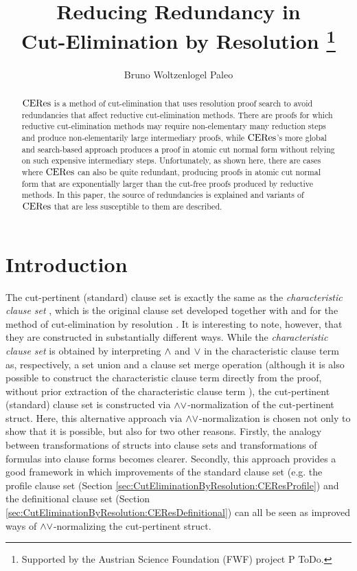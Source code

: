 \documentclass{llncs}
\title{
  Reducing Redundancy in \\ Cut-Elimination by Resolution
  \thanks{Supported by the Austrian Science Foundation (FWF) project P ToDo.}
}
\author{
  Bruno Woltzenlogel Paleo%
}
\institute{
  Theory and Logic Group, Vienna University of Technology, Vienna, Austria \\
  \email{bruno@logic.at}
}
\begin{document}
\maketitle



\begin{abstract}
$\mathrm{CERes}$ is a method of cut-elimination that uses resolution proof search to avoid redundancies that affect reductive cut-elimination methods. There are proofs for which reductive cut-elimination methods may require non-elementary many reduction steps and produce non-elementarily large intermediary proofs, while $\mathrm{CERes}$'s more global and search-based approach produces a proof in atomic cut normal form without relying on such expensive intermediary steps. Unfortunately, as shown here, there are cases where $\mathrm{CERes}$ can also be quite redundant, producing proofs in atomic cut normal form that are exponentially larger than the cut-free proofs produced by reductive methods. In this paper, the source of redundancies is explained and variants of $\mathrm{CERes}$ that are less susceptible to them are described.
\end{abstract}



\section{Introduction}


The cut-pertinent (standard) clause set is exactly the same as the \emph{characteristic clause set} , which is the original clause set developed together with and for the method of cut-elimination by resolution \cite{BaazLeitsch1999MethodsofCut-Elimination,BaazLeitsch2000Cut-eliminationandRedundancy-eliminationbyResolution,BaazLeitsch2006Towardsaclausalanalysisofcut-elimination}. It is interesting to note, however, that they are constructed in substantially different ways. While the \emph{characteristic clause set} is obtained by interpreting $\wedge$ and $\vee$ in the characteristic clause term as, respectively, a set union and a clause set merge operation (although it is also possible to construct the characteristic clause term directly from the proof, without prior extraction of the characteristic clause term \cite{BaazHetzlLeitschRichterSpohrCERES:AnAnalysisofFurstenberg'sProofoftheInfinityofPrimes}), the cut-pertinent (standard) clause set is constructed via $\wedge\vee$-normalization of the cut-pertinent struct. Here, this alternative approach via $\wedge\vee$-normalization is chosen not only to show that it is possible, but also for two other reasons. Firstly, the analogy between transformations of structs into clause sets and transformations of formulas into clause forms becomes clearer. Secondly, this approach provides a good framework in which improvements of the standard clause set (e.g. the profile clause set (Section \ref{sec:CutEliminationByResolution:CEResProfile}) and the definitional clause set (Section \ref{sec:CutEliminationByResolution:CEResDefinitional}) can all be seen as improved ways of $\wedge\vee$-normalizing the cut-pertinent struct.
\end{document}
